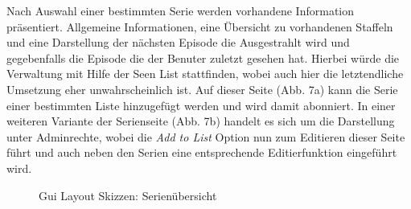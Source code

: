 \documentclass[a4paper]{article}
\begin{document}
Nach Auswahl einer bestimmten Serie werden vorhandene Information präsentiert. Allgemeine Informationen, eine Übersicht zu vorhandenen Staffeln und eine Darstellung der nächsten Episode die Ausgestrahlt wird und gegebenfalls die Episode die der Benuter zuletzt gesehen hat. Hierbei würde die Verwaltung mit Hilfe der Seen List stattfinden, wobei auch hier die letztendliche Umsetzung eher unwahrscheinlich ist.
Auf dieser Seite (Abb. 7a) kann die Serie einer bestimmten Liste hinzugefügt werden und wird damit abonniert. In einer weiteren Variante der Serienseite (Abb. 7b) handelt es sich um die Darstellung unter Adminrechte, wobei die \textit{Add to List} Option nun zum Editieren dieser Seite führt und auch neben den Serien eine entsprechende Editierfunktion eingeführt wird. 

\begin{figure} [h!]
\centering
\hfill %
\hfill %
\hfill %
\caption{Gui Layout Skizzen: Serienübersicht }
\label{Gui}
\end{figure}





\newpage 
\end{document}
